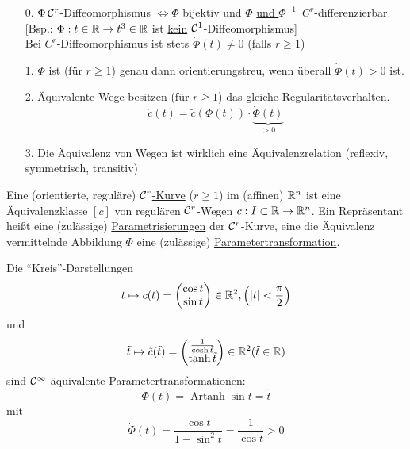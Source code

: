 \begin{bemerkung} \(\)
 \begin{enumerate}
  \item[0.] \(\Phi \, \mathcal{C}^r\)-Diffeomorphismus \(\Leftrightarrow \Phi\) bijektiv und \(\Phi\) \uline{und \(\Phi^{-1}\)}\, \(C^r\)-differenzierbar. 
  [Bsp.: \(\Phi: t \in \mathbb{R} \to t^3 \in \mathbb{R}\) ist \uline{kein} \(\mathcal{C}^1\)-Diffeomorphismus] \\
  Bei \(C^r\)-Diffeomorphismus ist stets \(\dot \Phi(t)\ne 0\) (falls \(r\ge 1\))
  \item[1.] \(\Phi\) ist (für \(r\ge 1\)) genau dann orientierungstreu, wenn überall \(\dot \Phi(t)>0\) ist.
  \item[2.] Äquivalente Wege besitzen (für \(r\ge 1\)) das gleiche Regularitätsverhalten.
  \[
   \dot c(t)= \dot{\tilde c} (\Phi(t)) \cdot \underbrace{\dot \Phi(t)}_{>0}
  \]
  \item[3.] Die Äquivalenz von Wegen ist wirklich eine Äquivalenzrelation (reflexiv, symmetrisch, transitiv)
 \end{enumerate}
\end{bemerkung}

\begin{definition}
 Eine (orientierte, reguläre) \uline{\(\mathcal{C}^r\)-Kurve} (\(r\ge1\)) im (affinen) \(\mathbb{R}^n\) ist eine Äquivalenzklasse \([c]\) von regulären \(\mathcal{C}^r\)-Wegen \(c : I \subset \mathbb{R} \to \mathbb{R}^n\). Ein Repräsentant heißt eine (zulässige) \uline{Parametrisierungen} der \(\mathcal{C}^r\)-Kurve, eine die Äquivalenz vermittelnde Abbildung \(\Phi\) eine (zulässige) \uline{Parametertransformation}.
\end{definition}

\begin{bsp}
 Die "`Kreis"'-Darstellungen \[t \mapsto c(t)=\begin{pmatrix}
                                              \cos t \\
                                              \sin t
                                             \end{pmatrix} \in \mathbb{R}^2, \left(|t|<\frac\pi2\right)
			     \]
 und \[\tilde t\mapsto \tilde c(\tilde t) = \begin{pmatrix}
                                             \frac1{\cosh \tilde t} \\
                                             \tanh \tilde t
                                            \end{pmatrix} \in \mathbb{R}^2 (\tilde t \in \mathbb{R}) 
     \]
 sind \(\mathcal{C}^\infty\)-äquivalente Parametertransformationen: \[
                                                            \Phi(t) = \operatorname{Artanh} \sin t = \tilde t
                                                           \]
mit
\[
 \dot \Phi(t)=\frac{\cos t}{1-\sin^2 t}= \frac1{\cos t} >0
\]

\end{bsp}

